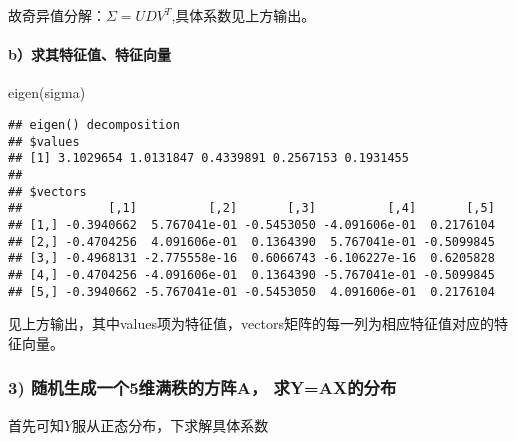 \documentclass[
]{article}
\newenvironment{Shaded}{\begin{snugshade}}{\end{snugshade}}
\newcommand{\FunctionTok}[1]{\textcolor[rgb]{0.00,0.00,0.00}{#1}}
\newcommand{\NormalTok}[1]{#1}
\begin{document}
故奇异值分解：\(\Sigma=UDV^T\),具体系数见上方输出。

\hypertarget{bux6c42ux5176ux7279ux5f81ux503cux7279ux5f81ux5411ux91cf}{%
\paragraph{\texorpdfstring{\textbf{b）求其特征值、特征向量}}{b）求其特征值、特征向量}}\label{bux6c42ux5176ux7279ux5f81ux503cux7279ux5f81ux5411ux91cf}}

\begin{Shaded}
\begin{Highlighting}[]
\FunctionTok{eigen}\NormalTok{(sigma)}
\end{Highlighting}
\end{Shaded}

\begin{verbatim}
## eigen() decomposition
## $values
## [1] 3.1029654 1.0131847 0.4339891 0.2567153 0.1931455
## 
## $vectors
##            [,1]          [,2]       [,3]          [,4]       [,5]
## [1,] -0.3940662  5.767041e-01 -0.5453050 -4.091606e-01  0.2176104
## [2,] -0.4704256  4.091606e-01  0.1364390  5.767041e-01 -0.5099845
## [3,] -0.4968131 -2.775558e-16  0.6066743 -6.106227e-16  0.6205828
## [4,] -0.4704256 -4.091606e-01  0.1364390 -5.767041e-01 -0.5099845
## [5,] -0.3940662 -5.767041e-01 -0.5453050  4.091606e-01  0.2176104
\end{verbatim}

见上方输出，其中values项为特征值，vectors矩阵的每一列为相应特征值对应的特征向量。

\hypertarget{ux968fux673aux751fux6210ux4e00ux4e2a5ux7ef4ux6ee1ux79e9ux7684ux65b9ux9635a-ux6c42yaxux7684ux5206ux5e03}{%
\subsubsection{\texorpdfstring{\textbf{3) 随机生成一个5维满秩的方阵A，
求Y=AX的分布}}{3) 随机生成一个5维满秩的方阵A， 求Y=AX的分布}}\label{ux968fux673aux751fux6210ux4e00ux4e2a5ux7ef4ux6ee1ux79e9ux7684ux65b9ux9635a-ux6c42yaxux7684ux5206ux5e03}}

首先可知\(Y\)服从正态分布，下求解具体系数
\end{document}
